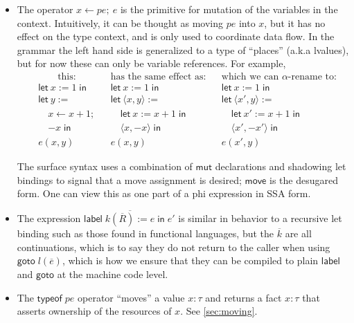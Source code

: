 \documentclass[acmsmall,nonacm]{acmart}
\begin{document}
\begin{itemize}
  \item The operator $x\gets pe;\ e$ is the primitive for mutation of the variables in the context. Intuitively, it can be thought as moving $pe$ into $x$, but it has no effect on the type context, and is only used to coordinate data flow. In the grammar the left hand side is generalized to a type of ``places'' (a.k.a lvalues), but for now these can only be variable references. For example,
  \begin{align*}
    &\qquad\mbox{this:}
      &&\!\!\!\!\!\!\mbox{has the same effect as:}
        &&\!\!\!\!\!\!\mbox{which we can $\alpha$-rename to:}\\
    &\mathsf{let}\ x := 1\;\mathsf{in}
      &&\mathsf{let}\ x := 1\;\mathsf{in}
        &&\mathsf{let}\ x := 1\;\mathsf{in}\\
    &\mathsf{let}\ y :=
      &&\mathsf{let}\ \langle x,y\rangle :=
        &&\mathsf{let}\ \langle x',y\rangle :=\\
    &\quad x \gets x+1;
      &&\quad \mathsf{let}\ x := x+1\;\mathsf{in}\;
        &&\quad \mathsf{let}\ x' := x+1\;\mathsf{in}\;\\
    &\quad {-x}\;\mathsf{in}
      &&\quad \langle x,-x\rangle\;\mathsf{in}
        &&\quad \langle x',-x'\rangle\;\mathsf{in}\\
    &e(x,y)
      &&e(x,y)
        &&e(x',y)
  \end{align*}

  The surface syntax uses a combination of $\mathsf{mut}$ declarations and shadowing let bindings to signal that a move assignment is desired; $\mathsf{move}$ is the desugared form.
  One can view this as one part of a phi expression in SSA form.

  \item The expression $\mathsf{label}\;\overline{k(\overline{R}):=e}\;\mathsf{in}\;e'$ is similar in behavior to a recursive let binding such as those found in functional languages, but the $\overline{k}$ are all continuations, which is to say they do not return to the caller when using $\mathsf{goto}\;l(\overline{e})$, which is how we ensure that they can be compiled to plain $\mathsf{label}$ and $\mathsf{goto}$ at the machine code level.

  \item The $\mathsf{typeof}\;pe$ operator ``moves'' a value $x:\tau$ and returns a fact $\boxed{x:\tau}$ that asserts ownership of the resources of $x$. See \ref{sec:moving}.
\end{itemize}
\end{document}
